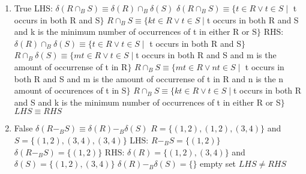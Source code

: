 \documentclass{4320hw}
\begin{document}
\begin{exercises}
\begin{enumerate}
\item
True
\newline
LHS:
\newline
$\delta(R \cap_B S) \equiv \delta(R) \cap_B \delta(S)$
\newline
$\delta(R \cap_B S) \equiv \{ t \in R \vee t \in S \mid$ t occurs in both R and S$\}$
\newline
$R \cap_B S \equiv \{ kt \in R \vee t \in S \mid $t occurs in both R and S and k is the minimum number of occurrences of t in either R or S$\} $
\newline
RHS:
\newline
$\delta(R) \cap_B \delta(S) \equiv  \{ t \in R \vee t \in S \mid$ t occurs in both R and S$\}$
\newline
$R \cap_B \delta(S) \equiv \{ mt \in R \vee t \in S \mid $t occurs in both R and S and m is the amount of occurrense of t in R$\}$
\newline
$R \cap_B S \equiv \{ mt \in R \vee nt \in S \mid $ t occurs in both R and S and m is the amount of occurrense of t in R and n is the n amount of occurences of t in S$\}$
\newline
$R \cap_B S \equiv \{ kt \in R \vee t \in S \mid $t occurs in both R and S and k is the minimum number of occurrences of t in either R or S$\} $
\newline
$LHS \equiv RHS$

\item
False
\newline
$\delta(R-_B S ) \equiv \delta(R) -_B \delta(S)$
\newline
$R=\{ (1,2), (1,2), (3,4)\}$ and $S=\{ (1,2), (3,4), (3,4) \}$
\newline
LHS:
\newline
$R -_BS = \{ (1,2) \}$
\newline
$\delta(R -_B S)= \{ (1,2) \}$
\newline
RHS:
\newline
$\delta(R)=\{ (1,2), (3,4) \}$ and $\delta(S)=\{ (1,2), (3,4) \}$
\newline
$ \delta(R) -_B \delta(S)=\{ \}$ empty set
\newline
$LHS \neq RHS$

\end{enumerate}

\end{exercises}
\end{document}
